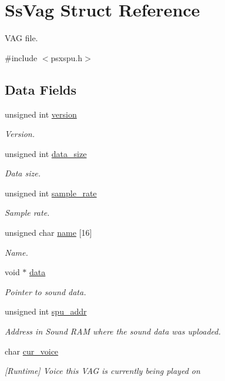 \hypertarget{structSsVag}{}\section{Ss\+Vag Struct Reference}
\label{structSsVag}


V\+A\+G file.  




{\ttfamily \#include $<$psxspu.\+h$>$}

\subsection*{Data Fields}
\begin{DoxyCompactItemize}
\item 
unsigned int \hyperlink{structSsVag_ad9ab18aa60cbf2641b770dfc0a51d2dc}{version}
\begin{DoxyCompactList}\small\item\em Version. \end{DoxyCompactList}\item 
unsigned int \hyperlink{structSsVag_a5a90d2091bd45c5c0bae18ae1bbeed28}{data\+\_\+size}
\begin{DoxyCompactList}\small\item\em Data size. \end{DoxyCompactList}\item 
unsigned int \hyperlink{structSsVag_adf52d04265b92a1aa68b63ed235cfdfa}{sample\+\_\+rate}
\begin{DoxyCompactList}\small\item\em Sample rate. \end{DoxyCompactList}\item 
unsigned char \hyperlink{structSsVag_aca71e6a5db585ab73a03d8f0743894e9}{name} \mbox{[}16\mbox{]}
\begin{DoxyCompactList}\small\item\em Name. \end{DoxyCompactList}\item 
void $\ast$ \hyperlink{structSsVag_a32e792329ffd00dac0bb87919ac19a75}{data}
\begin{DoxyCompactList}\small\item\em Pointer to sound data. \end{DoxyCompactList}\item 
unsigned int \hyperlink{structSsVag_a69eb2b0fb6383829e4e148dd1be8bdde}{spu\+\_\+addr}
\begin{DoxyCompactList}\small\item\em Address in Sound R\+A\+M where the sound data was uploaded. \end{DoxyCompactList}\item 
char \hyperlink{structSsVag_aab6f6eeadc95cb69ccb533e7eb3bfffa}{cur\+\_\+voice}
\begin{DoxyCompactList}\small\item\em \mbox{[}Runtime\mbox{]} Voice this V\+A\+G is currently being played on \end{DoxyCompactList}\end{DoxyCompactItemize}


